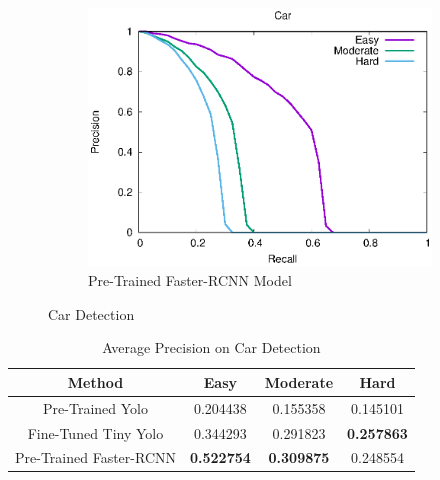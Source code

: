 \begin{figure}[H]
\begin{subfigure}{.34\textwidth}
    \includegraphics[width=1.0\linewidth]{img/FRCNN_Nov_8/plot_valid/car_detection.eps}
    \caption{Pre-Trained Faster-RCNN Model}
\end{subfigure}
\caption{Car Detection}
\end{figure}

\begin{table}[h!]
\centering
\begin{tabular}{ c | c | c | c }
\hline
Method & Easy & Moderate & Hard \\
\hline \hline
Pre-Trained Yolo & 0.204438 & 0.155358 & 0.145101 \\
Fine-Tuned Tiny Yolo & 0.344293 & 0.291823 & \bfseries 0.257863 \\
Pre-Trained Faster-RCNN & \bfseries 0.522754 & \bfseries 0.309875 & 0.248554 \\
\hline
\end{tabular}
\caption{Average Precision on Car Detection}
\end{table}

